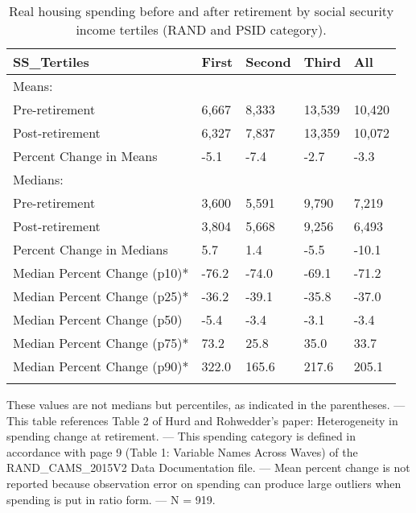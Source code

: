 \begin{table}[tbp] \centering
{}

\caption{Real housing spending before and after retirement by social security income tertiles (RAND and PSID category).}
\begin{tabularx}{\textwidth}{lCCCC}

\toprule
{SS\_Tertiles}&{First}&{Second}&{Third}&{All} \tabularnewline
\midrule\addlinespace[1.5ex]
Means:&&&& \tabularnewline
\midrule Pre-retirement&6,667&8,333&13,539&10,420 \tabularnewline
Post-retirement&6,327&7,837&13,359&10,072 \tabularnewline
Percent Change in Means&-5.1&-7.4&-2.7&-3.3 \tabularnewline
\midrule Medians:&&&& \tabularnewline
\midrule Pre-retirement&3,600&5,591&9,790&7,219 \tabularnewline
Post-retirement&3,804&5,668&9,256&6,493 \tabularnewline
Percent Change in Medians&5.7&1.4&-5.5&-10.1 \tabularnewline
Median Percent Change (p10)*&-76.2&-74.0&-69.1&-71.2 \tabularnewline
Median Percent Change (p25)*&-36.2&-39.1&-35.8&-37.0 \tabularnewline
Median Percent Change (p50)&-5.4&-3.4&-3.1&-3.4 \tabularnewline
Median Percent Change (p75)*&73.2&25.8&35.0&33.7 \tabularnewline
Median Percent Change (p90)*&322.0&165.6&217.6&205.1 \tabularnewline
\bottomrule \addlinespace[1.5ex]

\end{tabularx}
\begin{flushleft}
\footnotesize *These values are not medians but percentiles, as indicated in the parentheses. \linebreak --- \linebreak This table references Table 2 of Hurd and Rohwedder's paper: Heterogeneity in spending change at retirement. \linebreak --- \linebreak This spending category is defined in accordance with page 9 (Table 1: Variable Names Across Waves) of the RAND\_CAMS\_2015V2 Data Documentation file. \linebreak --- \linebreak Mean percent change is not reported because observation error on spending can produce large outliers when spending is put in ratio form. \linebreak --- \linebreak N = 919.
\end{flushleft}
\end{table}
